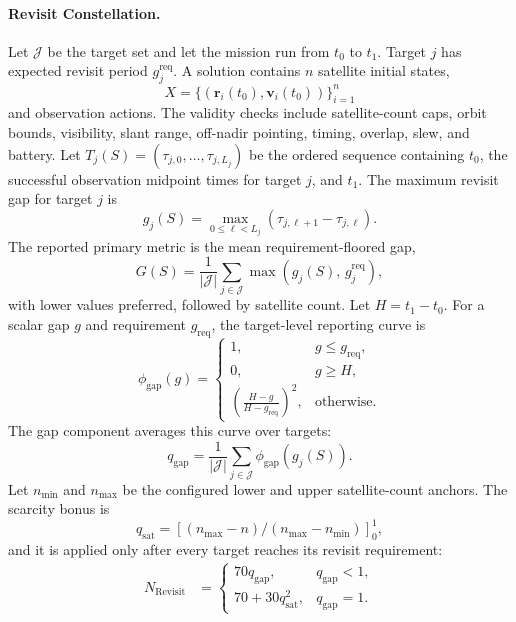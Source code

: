 \documentclass[]{mosi}
\begin{document}
\paragraph{Revisit Constellation.} Let \(\mathcal{J}\) be the target set and let the mission run from \(t_0\) to \(t_1\). Target \(j\) has expected revisit period \(g^{\mathrm{req}}_j\). A solution contains \(n\) satellite initial states,
\[
  X=\{(\mathbf{r}_i(t_0),\mathbf{v}_i(t_0))\}_{i=1}^{n}
\]
and observation actions. The validity checks include satellite-count caps, orbit bounds, visibility, slant range, off-nadir pointing, timing, overlap, slew, and battery. Let \(T_j(S)=(\tau_{j,0},\ldots,\tau_{j,L_j})\) be the ordered sequence containing \(t_0\), the successful observation midpoint times for target \(j\), and \(t_1\). The maximum revisit gap for target \(j\) is
\[
  g_j(S)=\max_{0\le \ell<L_j}(\tau_{j,\ell+1}-\tau_{j,\ell}).
\]
The reported primary metric is the mean requirement-floored gap,
\[
  G(S)=\frac{1}{|\mathcal{J}|}\sum_{j\in\mathcal{J}}\max(g_j(S),\,g^{\mathrm{req}}_j),
\]
with lower values preferred, followed by satellite count. Let \(H=t_1-t_0\). For a scalar gap \(g\) and requirement \(g_{\mathrm{req}}\), the target-level reporting curve is
\[
  \phi_{\mathrm{gap}}(g)=
  \begin{cases}
    1, & g\le g_{\mathrm{req}},\\
    0, & g\ge H,\\
    \left(\frac{H-g}{H-g_{\mathrm{req}}}\right)^2, & \text{otherwise}.
  \end{cases}
\]
The gap component averages this curve over targets:
\[
  q_{\mathrm{gap}}=\frac{1}{|\mathcal{J}|}\sum_{j\in\mathcal{J}}\phi_{\mathrm{gap}}(g_j(S)).
\]
Let \(n_{\min}\) and \(n_{\max}\) be the configured lower and upper satellite-count anchors. The scarcity bonus is
\[
  q_{\mathrm{sat}}=\left[(n_{\max}-n)/(n_{\max}-n_{\min})\right]_0^1,
\]
and it is applied only after every target reaches its revisit requirement:
\[
  \begin{aligned}
  N_{\mathrm{Revisit}}&=
    \begin{cases}
      70q_{\mathrm{gap}}, & q_{\mathrm{gap}}<1,\\
      70+30q_{\mathrm{sat}}^2, & q_{\mathrm{gap}}=1.
    \end{cases}
  \end{aligned}
\]
\end{document}
